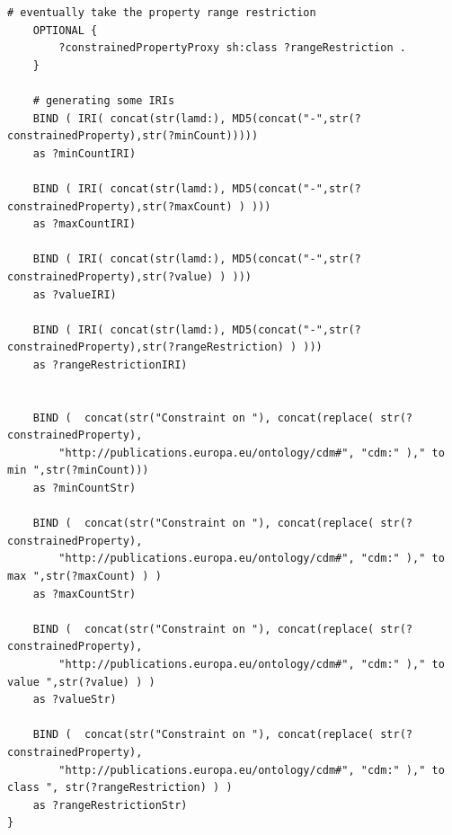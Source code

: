 \begin{lstlisting}[language=SPARQL, captionpos=b, caption={The transformation SPARQL query for LAM legal document class restrictions}, label=lst:sparql-class-constraint]
	# eventually take the property range restriction
	OPTIONAL {
		?constrainedPropertyProxy sh:class ?rangeRestriction .
	}
	
	# generating some IRIs
	BIND ( IRI( concat(str(lamd:), MD5(concat("-",str(?constrainedProperty),str(?minCount))))) 
	as ?minCountIRI)
	
	BIND ( IRI( concat(str(lamd:), MD5(concat("-",str(?constrainedProperty),str(?maxCount) ) ))) 
	as ?maxCountIRI)
	
	BIND ( IRI( concat(str(lamd:), MD5(concat("-",str(?constrainedProperty),str(?value) ) ))) 
	as ?valueIRI)
	
	BIND ( IRI( concat(str(lamd:), MD5(concat("-",str(?constrainedProperty),str(?rangeRestriction) ) ))) 
	as ?rangeRestrictionIRI)
	
	
	BIND (  concat(str("Constraint on "), concat(replace( str(?constrainedProperty), 
		"http://publications.europa.eu/ontology/cdm#", "cdm:" )," to min ",str(?minCount))) 
	as ?minCountStr)
	
	BIND (  concat(str("Constraint on "), concat(replace( str(?constrainedProperty), 
		"http://publications.europa.eu/ontology/cdm#", "cdm:" )," to max ",str(?maxCount) ) ) 
	as ?maxCountStr)
	
	BIND (  concat(str("Constraint on "), concat(replace( str(?constrainedProperty), 
		"http://publications.europa.eu/ontology/cdm#", "cdm:" )," to value ",str(?value) ) ) 
	as ?valueStr)
	
	BIND (  concat(str("Constraint on "), concat(replace( str(?constrainedProperty), 
		"http://publications.europa.eu/ontology/cdm#", "cdm:" )," to class ", str(?rangeRestriction) ) ) 
	as ?rangeRestrictionStr)
}
\end{lstlisting}

